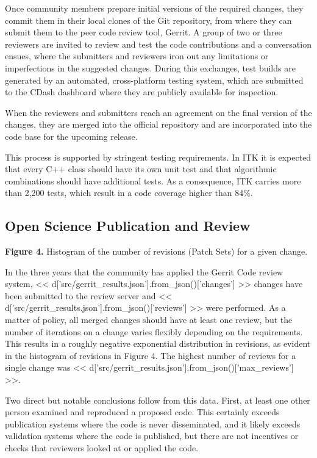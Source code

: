 \documentclass{frontiersENG} %
\begin{document}
Once community members prepare initial versions of the required changes, they
commit them in their local clones of the Git repository, from where they can
submit them to the peer code review tool, Gerrit. A group of two or three reviewers
are invited to review and test the code contributions and a conversation
ensues, where the submitters and reviewers iron out any limitations or
imperfections in the suggested changes. During this exchanges, test builds are
generated by an automated, cross-platform testing system, which are submitted to the CDash
dashboard where they are publicly available for inspection.

When the reviewers and submitters reach an agreement on the final version of
the changes, they are merged into the official repository and are incorporated
into the code base for the upcoming release.

This process is supported by stringent testing requirements. In ITK it is
expected that every C++ class should have its own unit test and that
algorithmic combinations should have additional tests. As a consequence, ITK
carries more than 2,200 tests, which result in a code coverage higher than 84\%.



\subsection{Open Science Publication and Review}

\textbf{Figure 4. }{Histogram of the number of revisions (Patch Sets) for a
given change.}\label{fig:04}

In the three years that the community has applied the Gerrit Code review
system, << d['src/gerrit_results.json'].from_json()['changes'] >> changes have
been submitted to the review server and
<< d['src/gerrit_results.json'].from_json()['reviews'] >> were performed.
As a matter of policy, all merged changes should have at least one review,
but the number of iterations on a change varies flexibly depending on the
requirements. This results in a roughly negative exponential distribution in
revisions, as evident in the histogram of revisions in
Figure 4.  The highest number of reviews
for a single change was
<< d['src/gerrit_results.json'].from_json()['max_reviews'] >>.

Two direct but notable conclusions follow from this data. First, at least one
other person examined and reproduced a proposed code.  This certainly exceeds
publication systems where the code is never disseminated, and it likely
exceeds validation systems where the code is published, but there are not
incentives or checks that reviewers looked at or applied the code.
\end{document}
